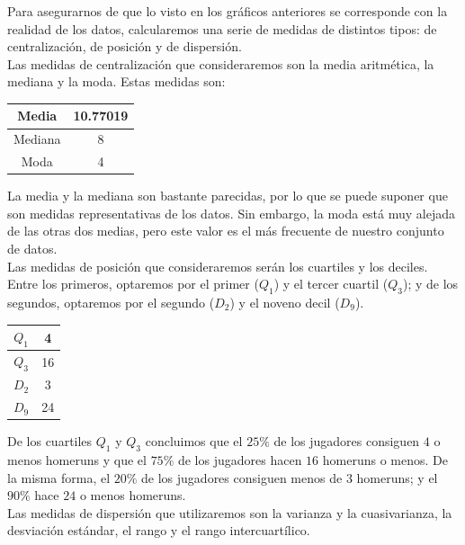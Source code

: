 \documentclass[12pt,a4paper,twoside,openright,titlepage,final]{article}
\begin{document}
Para asegurarnos de que lo visto en los gráficos anteriores se corresponde con la realidad de los datos, calcularemos una serie de medidas de distintos tipos: de centralización, de posición y de dispersión. \\

Las medidas de centralización que consideraremos son la media aritmética, la mediana y la moda. Estas medidas son:

\begin{table}[htbp]
\centering
\begin{tabular}{|c|c|}
\hline Media & 10.77019 \\ 
\hline Mediana & 8 \\ 
\hline Moda & 4  \\ 
\hline 
\end{tabular} 
\end{table}

La media y la mediana son bastante parecidas, por lo que se puede suponer que son medidas representativas de los datos. Sin embargo, la moda está muy alejada de las otras dos medias, pero este valor es el más frecuente de nuestro conjunto de datos.\\


Las medidas de posición que consideraremos serán los cuartiles y los deciles. Entre los primeros, optaremos por el primer ($Q_1$) y el tercer cuartil ($Q_3$); y de los segundos, optaremos por el segundo ($D_2$) y el noveno decil ($D_{9}$). \\

\begin{table}[htbp]
\centering
\begin{tabular}{|c|c|}
\hline $Q_1$ & 4 \\ 
\hline $Q_3$ & 16 \\ 
\hline $D_2$& 3  \\ 
\hline $D_9$& 24  \\ 
\hline 
\end{tabular} 
\end{table}

De los cuartiles $Q_1$ y $Q_3$ concluimos que el $25\%$ de los jugadores consiguen $4$ o menos homeruns y que el $75 \%$ de los jugadores hacen $16$ homeruns o menos. De la misma forma, el $20\%$ de los jugadores consiguen menos de $3$ homeruns; y el $90\%$ hace $24$ o menos homeruns.\\

Las medidas de dispersión que utilizaremos son la varianza y la cuasivarianza, la desviación estándar, el rango y el rango intercuartílico.\\
\end{document}
